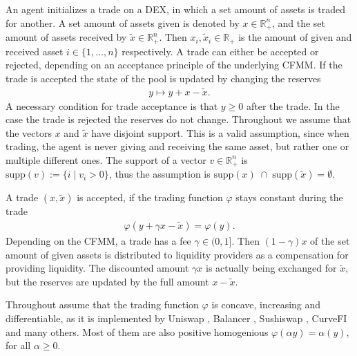 An agent initializes a trade on a DEX, in which a set amount of assets is
traded for another. A set amount of assets given is denoted by $x \in
\mathbb{R}^{n}_+$, and the set amount of assets received by $\tilde{x} \in
\mathbb{R}^{n}_+$. Then $x_i, \tilde{x}_i \in \mathbb{R}_+$ is the amount of
given and received asset $i \in \{1,\ldots,n\}$ respectively. A trade can either
be accepted or rejected, depending on an acceptance principle of the
underlying CFMM. If the trade is accepted the state of the pool is updated by
changing the reserves
\begin{align}
    y \mapsto y + x - \tilde{x}.
\end{align}
A necessary condition for trade acceptance is that $y \ge 0$ after the trade.
In the case the trade is rejected the reserves do not change. Throughout we
assume that the vectors $x$ and $\tilde{x}$ have disjoint support. This is a
valid assumption, since when trading, the agent is never giving and receiving
the same asset, but rather one or multiple different ones. The support of a
vector $v \in \mathbb{R}^{n}_+$ is $\text{supp}(v) := \{i\; |\; v_i > 0\}$,
thus the assumption is $\text{supp}(x)\;\cap\; \text{supp}(\tilde{x}) =
\emptyset$.

A trade $(x, \tilde{x})$ is accepted, if the trading function $\varphi$
stays constant during the trade
\begin{align}
    \varphi(y+\gamma x - \tilde{x}) = \varphi(y).
\end{align}
Depending on the CFMM, a trade has a fee $\gamma \in (0, 1]$. Then
$(1-\gamma)x$ of the set amount of given assets is distributed to liquidity
providers as a compensation for providing liquidity. The discounted amount
$\gamma x$ is actually being exchanged for $\tilde{x}$, but the reserves are
updated by the full amount $x - \tilde{x}$.

Throughout assume that the trading function $\varphi$ is concave,
increasing and differentiable, as it is implemented by Uniswap
\cite{uniswap}, Balancer \cite{balancer}, Sushiswap \cite{sushiswap}, CurveFI
\cite{curvefi} and many others. Most of them are also positive homogenious
$\varphi(\alpha y)=\alpha(y)$, for all $\alpha \ge 0$.
